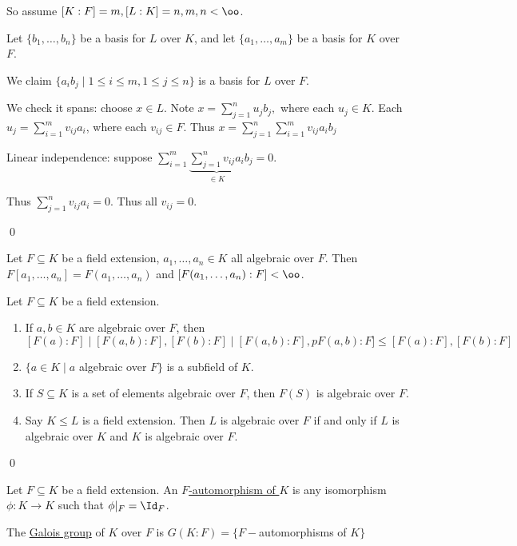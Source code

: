 \documentclass[x11names,reqno,14pt]{extarticle}
\begin{document}
So assume $[K:F] = m, [L:K] = n, m, n < \oo$. 

Let $\{b_1, \dots, b_n\}$ be a basis for $L$ over $K$, and let $\{a_1, \dots, a_m\}$ be a basis for $K$ over $F$. 

We claim $\{a_ib_j \mid 1 \leq i \leq m, 1 \leq j \leq n\}$ is a basis for $L$ over $F$. 

We check it spans: choose $x\in L$. Note $x = \sum_{j=1}^nu_jb_j,$ where each $u_j \in K$. Each $u_j = \sum_{i=1}^mv_{ij}a_i$, where each $v_{ij} \in F$. Thus $x = \sum_{j=1}^n\sum_{i=1}^mv_{ij}a_ib_j$

Linear independence: suppose $\sum_{i=1}^m \underbrace{\sum_{j=1}^nv_{ij}a_i}_{\in K}b_j = 0$. 

Thus $\sum_{j=1}^nv_{ij}a_i = 0$. Thus all $v_{ij} = 0$.

\qed

\cor

Let $F \subseteq K$ be a field extension, $a_1, \dots, a_n \in K$ all algebraic over $F$. Then $F[a_1,\dots, a_n] = F(a_1,\dots, a_n)$ and $[F(a_1, \dots, a_n):F] < \oo$.

\cor Let $F \subseteq K$ be a field extension.

\begin{enumerate}[label=(\alph*)]

\item If $a, b \in K$ are algebraic over $F$, then $[F(a):F] \mid [F(a, b): F], [F(b):F] \mid [F(a, b): F], pF(a, b): F] \leq [F(a): F],[F(b):F]$

\item $\{a\in K \mid a$ algebraic over $F\}$ is a subfield of $K$.

\item If $S \subseteq K$ is a set of elements algebraic over $F$, then $F(S)$ is algebraic over $F$. 

\item Say $K \leq L$ is a field extension. Then $L$ is algebraic over $F$ if and only if $L$ is algebraic over $K$ and $K$ is algebraic over $F$.

\end{enumerate}

\proof

\qed


Let $F \subseteq K$ be a field extension. An \underline{$F$-automorphism of $K$} is any isomorphism $\phi:K\to K$ such that $\phi|_F = \Id_F$. 

The \underline{Galois group} of $K$ over $F$ is $G(K:F) = \{F-$automorphisms of $K\}$
\end{document}
